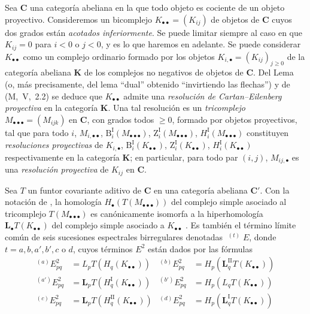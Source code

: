 \begin{env}[11.7.1]
\label{0.11.7.1}
\label{0.11.7.1-fr}
Sea $\boldsymbol{C}$ una categoría abeliana en la que todo objeto es cociente de un
objeto proyectivo.
Consideremos un bicomplejo $K_{\bullet\bullet}=(K_{ij})$ de objetos de $\boldsymbol{C}$ cuyos
dos grados están \emph{acotados inferiormente}.
Se puede limitar siempre al caso en que $K_{ij}=0$ para $i<0$ o
$j<0$, y es lo que haremos en adelante. Se puede considerar $K_{\bullet\bullet}$ como un complejo ordinario formado por los
objetos
$K_{i,\bullet}=(K_{ij})_{j\geq 0}$
de la categoría abeliana $\boldsymbol{K}$ de los complejos no negativos de objetos de
$\boldsymbol{C}$.
Del Lema~ (o, más precisamente, del lema
``dual'' obtenido ``invirtiendo las flechas'') y de (M,~V,~2.2) se deduce
que $K_{\bullet\bullet}$ admite una \emph{resolución de Cartan--Eilenberg
proyectiva} en la categoría $\boldsymbol{K}$.
Una tal resolución es un \emph{tricomplejo}
$M_{\bullet\bullet\bullet}=(M_{ijk})$ en $\boldsymbol{C}$, con grados todos $\geq 0$, formado por objetos proyectivos, tal que para todo $i$, $M_{i,\bullet\bullet}$, $\mathrm B_i^{\mathrm I}(M_{\bullet\bullet\bullet})$, $\mathrm Z_i^{\mathrm I}(M_{\bullet\bullet\bullet})$, $H_i^{\mathrm I}(M_{\bullet\bullet\bullet})$ constituyen \emph{resoluciones proyectivas} de $K_{i,\bullet}$, $\mathrm B_i^{\mathrm I}(K_{\bullet\bullet})$, $\mathrm Z_i^{\mathrm I}(K_{\bullet\bullet})$, $H_i^{\mathrm I}(K_{\bullet\bullet})$ respectivamente en la categoría $\boldsymbol{K}$; en particular, para todo par $(i,j)$, $M_{ij,\bullet}$ es una \emph{resolución
proyectiva} de $K_{ij}$ en $\boldsymbol{C}$.
\end{env}

\begin{proposition}[11.7.2]
\label{0.11.7.2}
\label{0.11.7.2-fr}
Sea $T$ un funtor covariante aditivo de $\boldsymbol{C}$ en una categoría
abeliana $\boldsymbol{C}'$.
Con la notación de , la homología
$H_\bullet(T(M_{\bullet\bullet\bullet}))$
del complejo simple asociado al tricomplejo
$T(M_{\bullet\bullet\bullet})$ es canónicamente isomorfa a la
hiperhomología $\mathbf{L}_\bullet T(K_{\bullet\bullet})$ del
complejo simple asociado a $K_{\bullet\bullet}$
.
Es también el término límite común de seis sucesiones espectrales birregulares denotadas
$\mathop{}^{(t)}E$, donde $t=a,b,a',b',c$ o $d$, cuyos
términos $E^2$ están dados por las fórmulas
\[
\begin{aligned}
{}^{(a)}E^2_{pq}&=L_pT(H_q(K_{\bullet\bullet}))&
{}^{(b)}E^2_{pq}&=H_p(\mathbf{L}_q^{\mathrm{II}}T(K_{\bullet\bullet}))\\
{}^{(a')}E^2_{pq}&=\mathbf{L}_pT(H_q^{\mathrm I}(K_{\bullet\bullet}))&
{}^{(b')}E^2_{pq}&=H_p(L_qT(K_{\bullet\bullet}))\\
{}^{(c)}E^2_{pq}&=\mathbf{L}_pT(H_q^{\mathrm{II}}(K_{\bullet\bullet}))&
{}^{(d)}E^2_{pq}&=H_p(\mathbf{L}_q^{\mathrm I}T(K_{\bullet\bullet}))
\end{aligned}
\]
\end{proposition}

